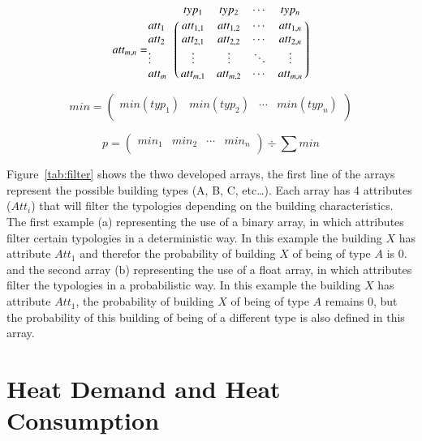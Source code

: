 \documentclass[authoryear,preprint,review,12pt]{elsarticle}
\begin{document}
\begin{linenumbers}
\begin{equation} \label{eq:att}
att_{m,n} = \bordermatrix{~ & typ_1 & typ_2 & \cdots & typ_n \cr
	att_1 & att_{1,1} & att_{1,2} & \cdots & att_{1,n} \cr
	att_2 & att_{2,1} & att_{2,2} & \cdots & att_{2,n} \cr
	\vdots & \vdots  & \vdots  & \ddots & \vdots  \cr
	att_m & att_{m,1} & att_{m,2} & \cdots & att_{m,n}}
\end{equation}

\begin{equation} \label{eq:att}
min = 
 \begin{pmatrix}
 min(typ_1) &
 min(typ_2) &
 \cdots &
 min(typ_n) \\
 \end{pmatrix}
\end{equation}

\begin{equation} \label{eq:att2}
p = 
 \begin{pmatrix}
 min_1 &
 min_2 &
 \cdots &
 min_n \\
 \end{pmatrix}
 \div \sum min
\end{equation}




Figure~\ref{tab:filter} shows the thwo developed arrays, the first line of the
arrays represent the possible building types (A, B, C, etc\dots).  Each array
has 4 attributes ($Att_{i}$) that will filter the typologies depending on the
building characteristics.  The first example (a) representing the use of a
binary array, in which attributes filter certain typologies in a deterministic
way. In this example the building $X$ has attribute $Att_1$ and therefor the
probability of building $X$ of being of type $A$ is 0.  and the second array
(b) representing the use of a float array, in which attributes filter the
typologies in a probabilistic way. In this example the building $X$ has
attribute $Att_1$, the probability of building $X$ of being of type $A$ remains
0, but the probability of this building of being of a different type is also
defined in this array.

\section{Heat Demand and Heat Consumption}\label{sec:result}


\end{linenumbers}
\end{document}
